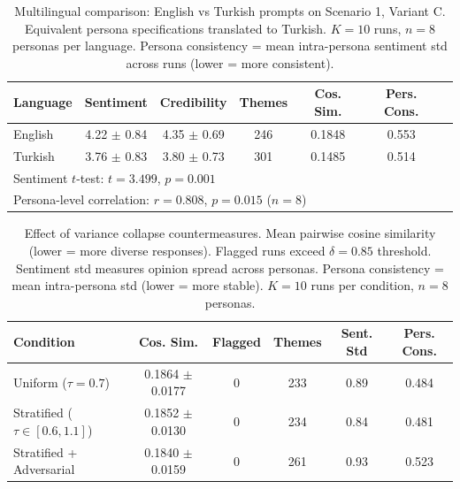\begin{table}[H]
\centering
\caption{Multilingual comparison: English vs Turkish prompts on Scenario 1, Variant C.
Equivalent persona specifications translated to Turkish. $K=10$ runs, $n=8$ personas per language.
Persona consistency = mean intra-persona sentiment std across runs (lower = more consistent).}
\label{tab:exp3_multilingual}
\small
\begin{tabular}{@{}lcccccc@{}}
\toprule
\textbf{Language} & \textbf{Sentiment} & \textbf{Credibility} & \textbf{Themes} & \textbf{Cos. Sim.} & \textbf{Pers. Cons.} \\
\midrule
    English & 4.22 $\pm$ 0.84 & 4.35 $\pm$ 0.69 & 246 & 0.1848 & 0.553 \\
    Turkish & 3.76 $\pm$ 0.83 & 3.80 $\pm$ 0.73 & 301 & 0.1485 & 0.514 \\
\midrule
\multicolumn{6}{l}{Sentiment $t$-test: $t=3.499$, $p=0.001$} \\
\multicolumn{6}{l}{Persona-level correlation: $r=0.808$, $p=0.015$ ($n=8$)} \\
\bottomrule
\end{tabular}
\end{table}


\begin{table}[H]
\centering
\caption{Effect of variance collapse countermeasures. Mean pairwise cosine similarity
(lower = more diverse responses). Flagged runs exceed $\delta = 0.85$ threshold.
Sentiment std measures opinion spread across personas. Persona consistency = mean
intra-persona std (lower = more stable). $K=10$ runs per condition, $n=8$ personas.}
\label{tab:exp4_variance}
\small
\begin{tabular}{@{}lccccc@{}}
\toprule
\textbf{Condition} & \textbf{Cos. Sim.} & \textbf{Flagged} & \textbf{Themes} & \textbf{Sent. Std} & \textbf{Pers. Cons.} \\
\midrule
    Uniform ($\tau=0.7$) & 0.1864 $\pm$ 0.0177 & 0 & 233 & 0.89 & 0.484 \\
    Stratified ($\tau\in[0.6,1.1]$) & 0.1852 $\pm$ 0.0130 & 0 & 234 & 0.84 & 0.481 \\
    Stratified + Adversarial & 0.1840 $\pm$ 0.0159 & 0 & 261 & 0.93 & 0.523 \\
\bottomrule
\end{tabular}
\end{table}


